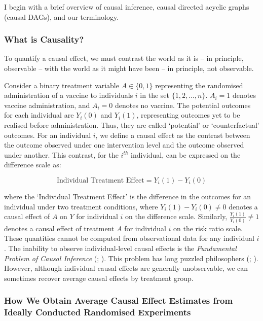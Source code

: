 \documentclass[
  single column]{article}
\begin{document}
I begin with a brief overview of causal inference, causal directed
acyclic graphs (causal DAGs), and our terminology.

\subsubsection{What is Causality?}\label{what-is-causality}

To quantify a causal effect, we must contrast the world as it is -- in
principle, observable -- with the world as it might have been -- in
principle, not observable.

Consider a binary treatment variable \(A \in \{0,1\}\) representing the
randomised administration of a vaccine to individuals \(i\) in the set
\(\{1, 2, \ldots, n\}\). \(A_i = 1\) denotes vaccine administration, and
\(A_i = 0\) denotes no vaccine. The potential outcomes for each
individual are \(Y_i(0)\) and \(Y_i(1)\), representing outcomes yet to
be realised before administration. Thus, they are called `potential' or
`counterfactual' outcomes. For an individual \(i\), we define a causal
effect as the contrast between the outcome observed under one
intervention level and the outcome observed under another. This
contrast, for the \(i^{th}\) individual, can be expressed on the
difference scale as:

\[
\text{Individual Treatment Effect} = Y_i(1) - Y_i(0)
\]

where the `Individual Treatment Effect' is the difference in the
outcomes for an individual under two treatment conditions, where
\(Y_i(1) - Y_i(0) \neq 0\) denotes a causal effect of \(A\) on \(Y\) for
individual \(i\) on the difference scale. Similarly,
\(\frac{Y_i(1)}{Y_i(0)} \neq 1\) denotes a causal effect of treatment
\(A\) for individual \(i\) on the risk ratio scale. These quantities
cannot be computed from observational data for any individual \(i\). The
inability to observe individual-level causal effects is the
\emph{Fundamental Problem of Causal Inference}
(;
). This problem has long puzzled
philosophers (;
). However, although individual
causal effects are generally unobservable, we can sometimes recover
average causal effects by treatment group.

\subsubsection{How We Obtain Average Causal Effect Estimates from
Ideally Conducted Randomised
Experiments}\label{how-we-obtain-average-causal-effect-estimates-from-ideally-conducted-randomised-experiments}
\end{document}
